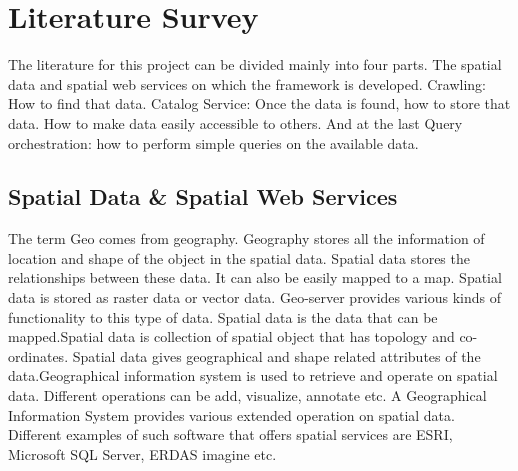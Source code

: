 \chapter{Literature Survey}
The literature for this project can be divided mainly into four parts. The spatial data and spatial web services on which the framework is developed. Crawling: How to find that data. Catalog Service: Once the data is found, how to store that data. How to make data easily accessible to others. And at the last Query orchestration: how to perform simple queries on the available data.

\section{Spatial Data \& Spatial Web Services}
\par
The term Geo comes from geography. Geography stores all the information of location and shape of the object in the spatial data. Spatial data stores the relationships between these data. It can also be easily mapped to a map. Spatial data is stored as raster data or vector data. Geo-server provides various kinds of functionality to this type of data. Spatial data is the data that can be mapped.Spatial data is collection of spatial object that has topology and co-ordinates. Spatial data gives geographical and shape related attributes of the data.Geographical information system is used to retrieve and operate on spatial data. Different operations can be add, visualize, annotate etc. A Geographical Information System provides various extended operation on spatial data. Different examples of such software that offers spatial services are ESRI, Microsoft SQL Server, ERDAS imagine etc.

